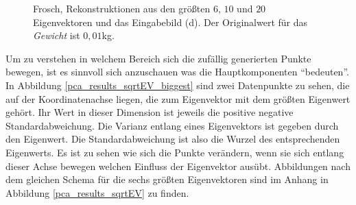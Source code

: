 \begin{figure}[H]
  \caption{Frosch, Rekonstruktionen aus den größten $6$, $10$ und $20$ Eigenvektoren und das Eingabebild (d). Der Originalwert für das \emph{Gewicht} ist $0{,}01$kg.}
  \label{frosch}
 \end{figure}
 
 
 Um zu verstehen in welchem Bereich sich die zufällig generierten Punkte bewegen, ist es sinnvoll sich anzuschauen was die Hauptkomponenten "`bedeuten"'. In Abbildung \ref{pca_results_sqrtEV_biggest} sind zwei Datenpunkte zu sehen, die auf der Koordinatenachse liegen, die zum Eigenvektor mit dem größten Eigenwert gehört. Ihr Wert in dieser Dimension ist jeweils die positive \bzw negative Standardabweichung. Die Varianz entlang eines Eigenvektors ist gegeben durch den Eigenwert. Die Standardabweichung ist also die Wurzel des entsprechenden Eigenwerts. Es ist zu sehen wie sich die Punkte verändern, wenn sie sich entlang dieser Achse bewegen \bzw welchen Einfluss der Eigenvektor ausübt. Abbildungen nach dem gleichen Schema für die sechs größten Eigenvektoren sind im Anhang in Abbildung \ref{pca_results_sqrtEV} zu finden.
 

